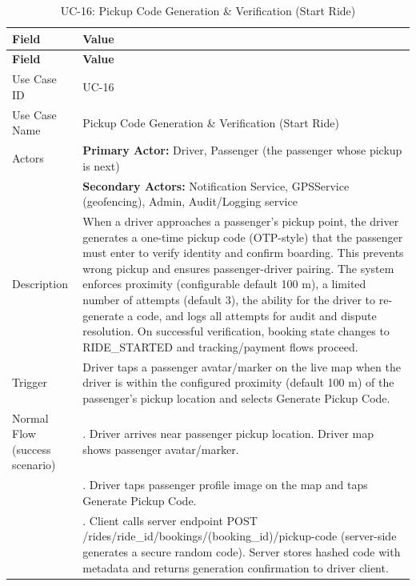 \begin{longtable}{|>{\raggedright\arraybackslash}p{4cm}|>{\raggedright\arraybackslash}p{11cm}|}
\caption{UC-16: Pickup Code Generation \& Verification (Start Ride)}
\label{tab:uc-16} \\
\hline
\rowcolor{lightgray!30}
\textbf{Field} & \textbf{Value} \\
\hline
\endfirsthead
\hline
\rowcolor{lightgray!30}
\textbf{Field} & \textbf{Value} \\
\hline
\endhead
\hline
\endfoot
\hline
\endlastfoot
Use Case ID & UC-16 \\
\hline
Use Case Name & Pickup Code Generation \& Verification (Start Ride) \\
\hline
Actors & \textbf{Primary Actor:} Driver, Passenger (the passenger whose pickup is next) \\
& \textbf{Secondary Actors:} Notification Service, GPSService (geofencing), Admin, Audit/Logging service \\
\hline
Description & When a driver approaches a passenger’s pickup point, the driver generates a one-time pickup code (OTP-style) that the passenger must enter to verify identity and confirm boarding. This prevents wrong pickup and ensures passenger-driver pairing. The system enforces proximity (configurable default 100 m), a limited number of attempts (default 3), the ability for the driver to re-generate a code, and logs all attempts for audit and dispute resolution. On successful verification, booking state changes to RIDE\_STARTED and tracking/payment flows proceed. \\
\hline
Trigger & Driver taps a passenger avatar/marker on the live map when the driver is within the configured proximity (default 100 m) of the passenger’s pickup location and selects Generate Pickup Code. \\
\hline
Normal Flow (success scenario) & 1. Driver arrives near passenger pickup location. Driver map shows passenger avatar/marker. \\
& 2. Driver taps passenger profile image on the map and taps Generate Pickup Code. \\
& 3. Client calls server endpoint POST /rides/ride\_id/bookings/(booking\_id)/pickup-code (server-side generates a secure random code). Server stores hashed code with metadata and returns generation confirmation to driver client. \\

\end{longtable}
